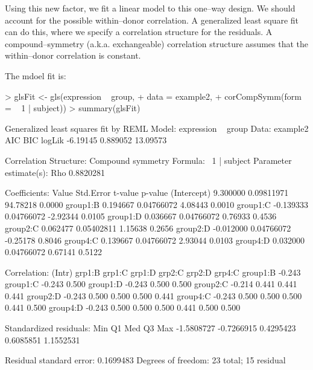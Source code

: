 \documentclass[12pt]{article}
\renewenvironment{Schunk}{\vspace{\topsep}}{\vspace{\topsep}}
\begin{document}
Using this new factor, we fit a linear model to this one--way design. We should account for the possible within--donor correlation. A generalized least square fit can do this, where we specify a correlation structure for the residuals. A compound--symmetry (a.k.a. exchangeable) correlation structure assumes that the within--donor correlation is constant. 

The mdoel fit is:
\begin{Schunk}
\begin{Sinput}
> glsFit <-  gls(expression ~ group, 
+                data = example2, 
+                corCompSymm(form = ~ 1 | subject))
> summary(glsFit)
\end{Sinput}
\begin{Soutput}
Generalized least squares fit by REML
  Model: expression ~ group 
  Data: example2 
       AIC      BIC   logLik
  -6.19145 0.889052 13.09573

Correlation Structure: Compound symmetry
 Formula: ~1 | subject 
 Parameter estimate(s):
      Rho 
0.8820281 

Coefficients:
                Value  Std.Error  t-value p-value
(Intercept)  9.300000 0.09811971 94.78218  0.0000
group1:B     0.194667 0.04766072  4.08443  0.0010
group1:C    -0.139333 0.04766072 -2.92344  0.0105
group1:D     0.036667 0.04766072  0.76933  0.4536
group2:C     0.062477 0.05402811  1.15638  0.2656
group2:D    -0.012000 0.04766072 -0.25178  0.8046
group4:C     0.139667 0.04766072  2.93044  0.0103
group4:D     0.032000 0.04766072  0.67141  0.5122

 Correlation: 
         (Intr) grp1:B grp1:C grp1:D grp2:C grp2:D grp4:C
group1:B -0.243                                          
group1:C -0.243  0.500                                   
group1:D -0.243  0.500  0.500                            
group2:C -0.214  0.441  0.441  0.441                     
group2:D -0.243  0.500  0.500  0.500  0.441              
group4:C -0.243  0.500  0.500  0.500  0.441  0.500       
group4:D -0.243  0.500  0.500  0.500  0.441  0.500  0.500

Standardized residuals:
       Min         Q1        Med         Q3        Max 
-1.5808727 -0.7266915  0.4295423  0.6085851  1.1552531 

Residual standard error: 0.1699483 
Degrees of freedom: 23 total; 15 residual
\end{Soutput}
\end{Schunk}
\end{document}
